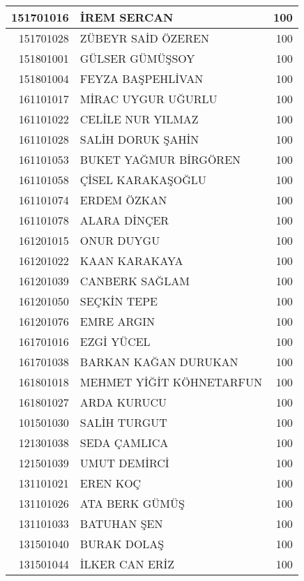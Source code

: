 \documentclass[12pt]{article}
\begin{document}
\begin{longtable}{||r||l||r||}
    151701016 & İREM SERCAN & 100 \\
    \midrule
    151701028 & ZÜBEYR SAİD ÖZEREN & 100 \\
    \midrule
    151801001 & GÜLSER GÜMÜŞSOY & 100 \\
    \midrule
    151801004 & FEYZA BAŞPEHLİVAN & 100 \\
    \midrule
    161101017 & MİRAC UYGUR UĞURLU & 100 \\
    \midrule
    161101022 & CELİLE NUR YILMAZ & 100 \\
    \midrule
    161101028 & SALİH DORUK ŞAHİN & 100 \\
    \midrule
    161101053 & BUKET YAĞMUR BİRGÖREN & 100 \\
    \midrule
    161101058 & ÇİSEL KARAKAŞOĞLU & 100 \\
    \midrule
    161101074 & ERDEM ÖZKAN & 100 \\
    \midrule
    161101078 & ALARA DİNÇER & 100 \\
    \midrule
    161201015 & ONUR DUYGU & 100 \\
    \midrule
    161201022 & KAAN KARAKAYA & 100 \\
    \midrule
    161201039 & CANBERK SAĞLAM & 100 \\
    \midrule
    161201050 & SEÇKİN TEPE & 100 \\
    \midrule
    161201076 & EMRE ARGIN & 100 \\
    \midrule
    161701016 & EZGİ YÜCEL & 100 \\
    \midrule
    161701038 & BARKAN KAĞAN DURUKAN & 100 \\
    \midrule
    161801018 & MEHMET YİĞİT KÖHNETARFUN & 100 \\
    \midrule
    161801027 & ARDA KURUCU & 100 \\
    \midrule
    101501030 & SALİH TURGUT & 100 \\
    \midrule
    121301038 & SEDA ÇAMLICA & 100 \\
    \midrule
    121501039 & UMUT DEMİRCİ & 100 \\
    \midrule
    131101021 & EREN KOÇ & 100 \\
    \midrule
    131101026 & ATA BERK GÜMÜŞ & 100 \\
    \midrule
    131101033 & BATUHAN ŞEN & 100 \\
    \midrule
    131501040 & BURAK DOLAŞ & 100 \\
    \midrule
    131501044 & İLKER CAN ERİZ & 100 \\
    \midrule

\end{longtable}
\end{document}
